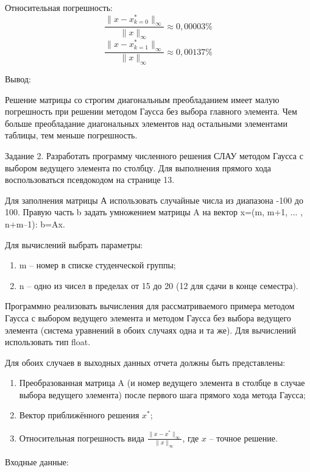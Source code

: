 \documentclass[a4paper, 12pt]{article}
\begin{document}
\normalsize
Относительная погрешность:
\[
\frac{\|x - x^*_{k = 0}\|_{\infty}}{\|x\|_{\infty}} \approx 0,00003\%
\]
\[
\frac{\|x - x^*_{k = 1}\|_{\infty}}{\|x\|_{\infty}} \approx 0,00137\%
\]

\normalsize Вывод:

Решение матрицы со строгим диагональным преобладанием имеет малую погрешность при решении методом Гаусса без выбора главного элемента. Чем больше преобладание диагональных элементов над остальными элементами таблицы, тем меньше погрешность.

\vspace{2cm}

Задание 2.
Разработать программу численного решения СЛАУ методом Гаусса с выбором ведущего элемента по столбцу. Для выполнения прямого хода воспользоваться псевдокодом на странице 13.

Для заполнения матрицы А использовать случайные числа из диапазона -100 до 100. Правую часть b задать умножением матрицы A на вектор x=(m, m+1, ... , n+m–1): b=Ax.

Для вычислений выбрать параметры:

\begin{enumerate}
	\item m – номер в списке студенческой группы;
	
	\item n – одно из чисел в пределах от 15 до 20 (12 для сдачи в конце семестра).
\end{enumerate}

Программно реализовать вычисления для рассматриваемого примера методом Гаусса с выбором ведущего элемента и методом Гаусса без выбора ведущего элемента (система уравнений в обоих случаях одна и та же). Для вычислений использовать тип float.

Для обоих случаев в выходных данных отчета должны быть представлены:

\begin{enumerate}
	\item Преобразованная матрица A (и номер ведущего элемента в столбце в случае выбора ведущего элемента) после первого шага прямого хода метода Гаусса;
	\item Вектор приближённого решения \(x^*\);
	\item Относительная погрешность вида $\frac{\|x - x^*\|_{\infty}}{\|x\|_{\infty}}$, где \(x\) – точное решение.
\end{enumerate}

Входные данные: 
\end{document}
